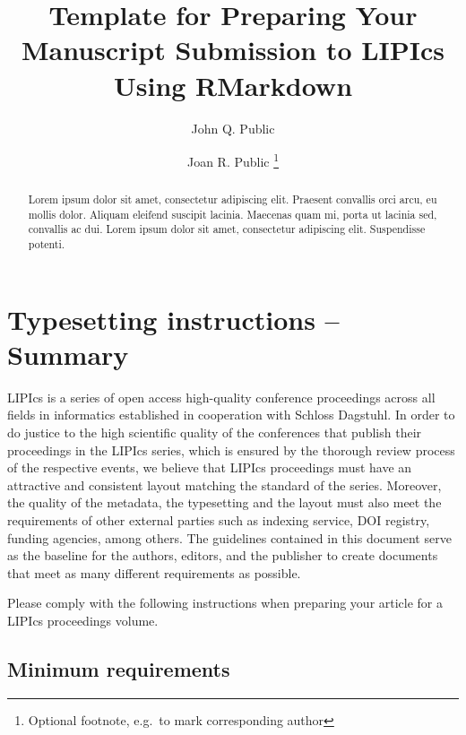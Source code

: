 \documentclass[a4paper ,UKenglish  ,cleveref ,autoref ,thm-restate   ]{lipics-v2019}
\title{Template for Preparing Your Manuscript Submission to LIPIcs Using
RMarkdown}
\author{John Q. Public }{Dummy University Computing Laboratory, {[}optional: Address{]}, Country
\and My second affiliation, Country \and \url{http://www.myhomepage.edu}}{johnqpublic@dummyuni.org}{https://orcid.org/0000-0002-1825-0097}{ (Optional) author-specific funding acknowledgements }
\author{Joan R. Public \footnote{Optional footnote, e.g.~to mark corresponding author} }{Department of Informatics, Dummy College, {[}optional: Address{]},
Country}{joanrpublic@dummycollege.org}{}{}
\begin{document}
\maketitle

\begin{abstract}
Lorem ipsum dolor sit amet, consectetur adipiscing elit. Praesent
convallis orci arcu, eu mollis dolor. Aliquam eleifend suscipit lacinia.
Maecenas quam mi, porta ut lacinia sed, convallis ac dui. Lorem ipsum
dolor sit amet, consectetur adipiscing elit. Suspendisse potenti.
\end{abstract}

\section{Typesetting instructions -- Summary}

LIPIcs is a series of open access high-quality conference proceedings
across all fields in informatics established in cooperation with Schloss
Dagstuhl. In order to do justice to the high scientific quality of the
conferences that publish their proceedings in the LIPIcs series, which
is ensured by the thorough review process of the respective events, we
believe that LIPIcs proceedings must have an attractive and consistent
layout matching the standard of the series. Moreover, the quality of the
metadata, the typesetting and the layout must also meet the requirements
of other external parties such as indexing service, DOI registry,
funding agencies, among others. The guidelines contained in this
document serve as the baseline for the authors, editors, and the
publisher to create documents that meet as many different requirements
as possible.

Please comply with the following instructions when preparing your
article for a LIPIcs proceedings volume.

\subsection*{Minimum requirements}
\end{document}
